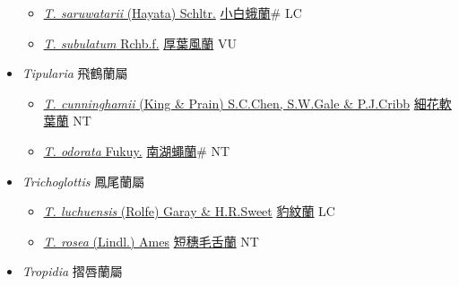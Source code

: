 \begin{itemize}
\begin{itemize}
        \item[] \href{http://www.theplantlist.org/tpl1.1/search?q=Thrixspermum+saruwatarii}{\textit{T. saruwatarii} (Hayata) Schltr.}   \href{\detokenize{http://taibnet.sinica.edu.tw/chi/taibnet_species_list.php?T2=小白蛾蘭&T2_new_value=true&fr=y}}{小白蛾蘭}\# LC
        \item[] \href{http://www.theplantlist.org/tpl1.1/search?q=Thrixspermum+subulatum}{\textit{T. subulatum} Rchb.f.}   \href{\detokenize{http://taibnet.sinica.edu.tw/chi/taibnet_species_list.php?T2=厚葉風蘭&T2_new_value=true&fr=y}}{厚葉風蘭} VU
  \end{itemize}
 \item[] \textit{Tipularia} 飛鶴蘭屬
                    
  \begin{itemize}
        \item[] \href{http://www.theplantlist.org/tpl1.1/search?q=Tipularia+cunninghamii}{\textit{T. cunninghamii} (King \& Prain) S.C.Chen, S.W.Gale \& P.J.Cribb}   \href{\detokenize{http://taibnet.sinica.edu.tw/chi/taibnet_species_list.php?T2=細花軟葉蘭&T2_new_value=true&fr=y}}{細花軟葉蘭} NT
        \item[] \href{http://www.theplantlist.org/tpl1.1/search?q=Tipularia+odorata}{\textit{T. odorata} Fukuy.}   \href{\detokenize{http://taibnet.sinica.edu.tw/chi/taibnet_species_list.php?T2=南湖蠅蘭&T2_new_value=true&fr=y}}{南湖蠅蘭}\# NT
  \end{itemize}
 \item[] \textit{Trichoglottis} 鳳尾蘭屬
                    
  \begin{itemize}
        \item[] \href{http://www.theplantlist.org/tpl1.1/search?q=Trichoglottis+luchuensis}{\textit{T. luchuensis} (Rolfe) Garay \& H.R.Sweet}     \href{\detokenize{http://taibnet.sinica.edu.tw/chi/taibnet_species_list.php?T2=豹紋蘭&T2_new_value=true&fr=y}}{豹紋蘭} LC
        \item[] \href{http://www.theplantlist.org/tpl1.1/search?q=Trichoglottis+rosea}{\textit{T. rosea} (Lindl.) Ames}   \href{\detokenize{http://taibnet.sinica.edu.tw/chi/taibnet_species_list.php?T2=短穗毛舌蘭&T2_new_value=true&fr=y}}{短穗毛舌蘭} NT
  \end{itemize}
 \item[] \textit{Tropidia} 摺唇蘭屬
                    

\end{itemize}
